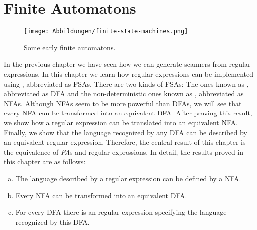 \chapter{Finite Automatons \label{chapter:finite-state-machines}} 

\begin{figure}[h] 
\centering
  \texttt{[image: Abbildungen/finite-state-machines.png]}
\caption{Some early finite automatons.}
\label{fig:hieroglyphs.png}
\end{figure}

\noindent
In the previous chapter we have seen how we can generate scanners from regular expressions.  In this chapter
we learn how regular expressions can be implemented using ,
abbreviated as \textsc{FSA}s. There are two kinds of \textsc{FSA}s: The  ones known as
, abbreviated as \textsc{DFA} 
and the non-deterministic ones known as , abbreviated as
\textsc{NFA}s.  Although \textsc{NFA}s seem to be more powerful than \textsc{DFA}s, we will see that every
\textsc{NFA} can be transformed into an equivalent \textsc{DFA}.  After proving this result, we show how a regular
expression can be translated into an equivalent  \textsc{NFA}.  Finally, we show that the
language recognized by any \textsc{DFA} can be described by an equivalent regular expression.  Therefore, the
central result of this chapter is the equivalence of \textsl{FA}s and regular expressions.
In detail, the results proved in this chapter are as follows:
\begin{enumerate}[(a)]
\item The language described by a regular expression can be defined by a \textsc{NFA}.
\item Every \textsc{NFA} can be transformed into an equivalent \textsc{DFA}.
\item For every \textsc{DFA} there is an regular expression specifying the language recognized by
      this \textsc{DFA}.
\end{enumerate}


